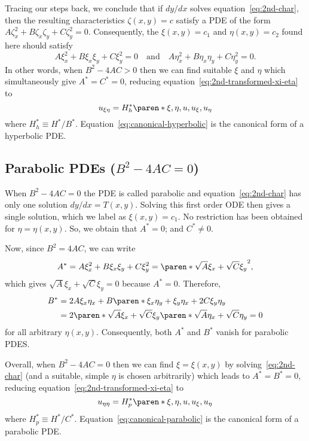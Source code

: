 \documentclass[11pt]{penrose}
\begin{document}
Tracing our steps back, we conclude that if $dy/dx$ solves equation~\eqref{eq:2nd-char}, then the resulting characteristics $\zeta(x,y) = c$ satisfy a PDE of the form $A \zeta_x^2 + B \zeta_x \zeta_y + C \zeta_y^2 = 0$. Consequently, the $\xi(x,y) = c_1$ and $\eta(x,y) = c_2$ found here should satisfy
\begin{equation}
    A \xi_x^2 + B \xi_x \xi_y + C \xi_y^2 = 0
    \quad\text{and}\quad
    A \eta_x^2 + B \eta_x \eta_y + C \eta_y^2 = 0.
\end{equation}
In other words, when $B^2 - 4AC > 0$ then we can find suitable $\xi$ and $\eta$ which simultaneously give $A^* = C^* = 0$, reducing equation~\eqref{eq:2nd-transformed-xi-eta} to
\begin{equation}
    u_{\xi\eta} = H_{h}^{*}\paren*{\xi, \eta, u, u_\xi, u_\eta}
    \label{eq:canonical-hyperbolic}
\end{equation}
where $H_{h}^{*} \equiv H^{*} / B^{*}$. Equation~\eqref{eq:canonical-hyperbolic} is the canonical form of a hyperbolic PDE.

\subsection{Parabolic PDEs \texorpdfstring{($B^2 - 4AC = 0$)}{B2 - 4AC = 0}}
When $B^2 - 4AC = 0$ the PDE is called parabolic and equation~\eqref{eq:2nd-char} has only one solution $dy/dx = T(x,y)$. Solving this first order ODE then gives a single solution, which we label as $\xi(x,y) = c_1$. No restriction has been obtained for $\eta = \eta(x,y)$. So, we obtain that $A^{*} = 0$; and $C^{*} \neq 0$.

Now, since $B^2 = 4AC$, we can write
\begin{equation}
    A^{*}
    = A \xi_x^2 + B \xi_x \xi_y + C \xi_y^2
    = \paren*{ \sqrt{A} \xi_x + \sqrt{C} \xi_y }^2,
\end{equation}
which gives $\sqrt{A} \xi_x + \sqrt{C} \xi_y = 0$ because $A^{*} = 0$. Therefore,
\begin{align}
    B^{*}
    &= 2A\xi_x \eta_x + B \paren*{\xi_x \eta_y + \xi_y \eta_x} + 2C \xi_y \eta_y\\
    &= 2 \paren*{ \sqrt{A} \xi_x + \sqrt{C} \xi_y } \paren*{ \sqrt{A} \eta_x + \sqrt{C} \eta_y }
    = 0
\end{align}
for all arbitrary $\eta(x,y)$. Consequently, both $A^*$ and $B^*$ vanish for parabolic PDES.

Overall, when $B^2 - 4AC = 0$ then we can find $\xi = \xi(x,y)$ by solving~\eqref{eq:2nd-char} (and a suitable, simple $\eta$ is chosen arbitrarily) which leads to $A^* = B^* = 0$, reducing equation~\eqref{eq:2nd-transformed-xi-eta} to
\begin{equation}
    u_{\eta\eta} = H_{p}^{*}\paren*{\xi, \eta, u, u_\xi, u_\eta}
    \label{eq:canonical-parabolic}
\end{equation}
where $H_{p}^{*} \equiv H^{*} / C^{*}$. Equation~\eqref{eq:canonical-parabolic} is the canonical form of a parabolic PDE.
\end{document}

